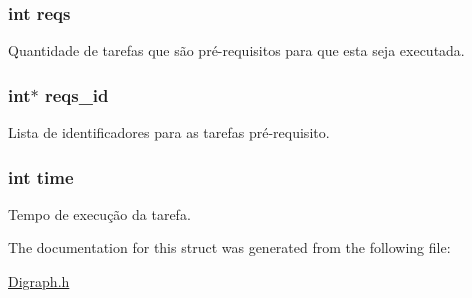 \subsubsection[{\texorpdfstring{reqs}{reqs}}]{\setlength{\rightskip}{0pt plus 5cm}int reqs}\hypertarget{structvertex_array_aafaa8921a9db42eefd598924305f2772}{}\label{structvertex_array_aafaa8921a9db42eefd598924305f2772}
Quantidade de tarefas que são pré-\/requisitos para que esta seja executada. 
\subsubsection[{\texorpdfstring{reqs\+\_\+id}{reqs_id}}]{\setlength{\rightskip}{0pt plus 5cm}int$\ast$ reqs\+\_\+id}\hypertarget{structvertex_array_adf15d2ca9e8f0bf7eb53e25582b79cda}{}\label{structvertex_array_adf15d2ca9e8f0bf7eb53e25582b79cda}
Lista de identificadores para as tarefas pré-\/requisito. 
\subsubsection[{\texorpdfstring{time}{time}}]{\setlength{\rightskip}{0pt plus 5cm}int time}\hypertarget{structvertex_array_a42715f65f02da52edc5b22021d8ae670}{}\label{structvertex_array_a42715f65f02da52edc5b22021d8ae670}
Tempo de execução da tarefa. 

The documentation for this struct was generated from the following file\+:\begin{DoxyCompactItemize}
\item 
\hyperlink{_digraph_8h}{Digraph.\+h}\end{DoxyCompactItemize}
